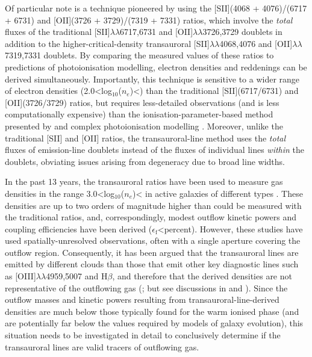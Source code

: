 Of particular note is a technique pioneered by \citet{Holt2011} using the [SII](4068 + 4076)/(6717 + 6731) and [OII](3726 + 3729)/(7319 + 7331) ratios, which involve the \textit{total} fluxes of the traditional [SII]$\lambda\lambda$6717,6731 and [OII]$\lambda\lambda$3726,3729 doublets in addition to the higher-critical-density transauroral \citep{Boyce1933} [SII]$\lambda\lambda$4068,4076 and [OII]$\lambda\lambda$7319,7331 doublets. By comparing the measured values of these ratios to predictions of photoionisation modelling, electron densities and reddenings can be derived simultaneously. Importantly, this technique is sensitive to a wider range of electron densities (2.0\;\textless\;log$_{10}$($n_e$\;[cm$^{-3}$])\;\textless{}) than the traditional [SII](6717/6731) and [OII](3726/3729) ratios, but requires less-detailed observations (and is less computationally expensive) than the ionisation-parameter-based method presented by \citet{Baron2019b} and complex photoionisation modelling \citep{Collins2009, Crenshaw2015, Revalski2021}. Moreover, unlike the traditional [SII] and [OII] ratios, the transauroral-line method uses the \textit{total} fluxes of emission-line doublets instead of the fluxes of individual lines \textit{within} the doublets, obviating issues arising from degeneracy due to broad line widths.

In the past 13 years, the transauroral ratios have been used to measure gas densities in the range 3.0\;\textless\;log$_{10}$($n_e$\;[cm$^{-3}$])\;\textless{} in active galaxies of different types \citep{Holt2011, Rose2018, Santoro2018, Spence2018, RamosAlmeida2019, Santoro2020, Davies2020, Speranza2022}. These densities are up to two orders of magnitude higher than could be measured with the traditional ratios, and, correspondingly, modest outflow kinetic powers and coupling efficiencies have been derived ($\epsilon_\mathrm{f}$\;\textless{}\;per\;cent). However, these studies have used spatially-unresolved observations, often with a single aperture covering the outflow region. Consequently, it has been argued that the transauroral lines are emitted by different clouds than those that emit other key diagnostic lines such as [OIII]$\lambda\lambda$4959,5007 and H$\beta$, and therefore that the derived densities are not representative of the outflowing gas (\citealt{Sun2017}; but see discussions in \citealt{Rose2018} and \citealt{Spence2018}). Since the outflow masses and kinetic powers resulting from transauroral-line-derived densities are much below those typically found for the warm ionised phase (and are potentially far below the values required by models of galaxy evolution), this situation needs to be investigated in detail to conclusively determine if the transauroral lines are valid tracers of outflowing gas.

